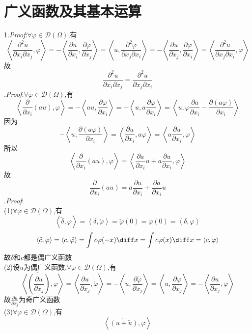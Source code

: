 \section{广义函数及其基本运算}
1.\textit{Proof}:$\forall\varphi\in\mathscr{D}(\Omega)$,有
\[
\left\langle\frac{\partial^2u}{\partial x_i\partial x_j},\varphi\right\rangle=-\left\langle\frac{\partial u}{\partial x_i},\frac{\partial\varphi}{\partial x_j}\right\rangle
=\left\langle u,\frac{\partial^2\varphi}{\partial x_j\partial x_i}\right\rangle
=-\left\langle\frac{\partial u}{\partial x_j},\frac{\partial\varphi}{\partial x_i}\right\rangle
=\left\langle\frac{\partial^2u}{\partial x_j\partial x_i},\varphi\right\rangle
\]
故\[\frac{\partial^2u}{\partial x_i\partial x_j}=\frac{\partial^2u}{\partial x_j\partial x_i}\]
.\textit{Proof}:$\forall\varphi\in\mathscr{D}(\Omega)$,有
\[\left\langle\frac{\partial}{\partial x_i}(au),\varphi\right\rangle=-\left\langle au,\frac{\partial\varphi}{\partial x_i}\right\rangle=-\left\langle u,a\frac{\partial\varphi}{\partial x_i}\right\rangle=\left\langle u,\varphi\frac{\partial a}{\partial x_i}-\frac{\partial(a\varphi)}{\partial x_i}\right\rangle\]
因为
\[-\left\langle u,\frac{\partial(a\varphi)}{\partial x_i}\right\rangle=\left\langle\frac{\partial u}{\partial x_i},a\varphi\right\rangle=\left\langle a\frac{\partial u}{\partial x_i},\varphi\right\rangle\]
所以
\[\left\langle\frac{\partial}{\partial x_i}(au),\varphi\right\rangle=\left\langle\frac{\partial a}{\partial x_i}u+a\frac{\partial u}{\partial x_i},\varphi\right\rangle\]
故
\[\frac{\partial}{\partial x_i}(au)=a\frac{\partial u}{\partial x_i}+\frac{\partial a}{\partial x_i}u\]
.\textit{Proof}:\\
(1)$\forall\varphi\in\mathscr{D}(\Omega)$,有
\[\left\langle\check{\delta},\varphi\right\rangle=\left\langle\delta,\check{\varphi}\right\rangle=\check{\varphi}(0)=\varphi(0)=\left\langle\delta,\varphi\right\rangle\]
\[\left\langle\check{c},\varphi\right\rangle=\left\langle c,\check{\varphi}\right\rangle=\int c\varphi(-x)\diff x=\int c\varphi(x)\diff x=\left\langle c,\varphi\right\rangle\]
故$\delta$和$c$都是偶广义函数\\
(2)设$u$为偶广义函数,$\forall\varphi\in\mathscr{D}(\Omega)$,有
\[\left\langle\check{\left(\frac{\partial u}{\partial x_j}\right)},\varphi\right\rangle=\left\langle\frac{\partial u}{\partial x_j},\check{\varphi}\right\rangle=-\left\langle u,\frac{\partial\check{\varphi}}{\partial x_j}\right\rangle=\left\langle u,\frac{\partial\varphi}{\partial x_j}\right\rangle=-\left\langle\frac{\partial u}{\partial x_j},\varphi\right\rangle\]
故$\frac{\partial u}{\partial x_j}$为奇广义函数\\
(3)$\forall\varphi\in\mathscr{D}(\Omega)$,有
\[\left\langle\check{(u+\check{u})},\varphi\right\rangle\]